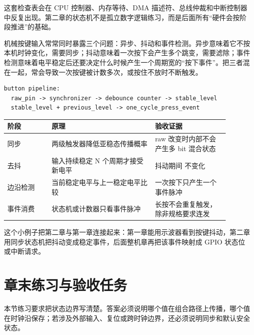 这套检查表会在 CPU 控制器、内存等待、DMA 描述符、总线仲裁和中断控制器中反复出现。第二章的状态机不是孤立数字逻辑练习，而是后面所有“硬件会按阶段推进”的基础。

机械按键输入常常同时暴露三个问题：异步、抖动和事件检测。异步意味着它不按本机时钟变化，需要同步；抖动意味着一次按下会产生多个跳变，需要滤除；事件检测意味着电平稳定后还要决定什么时候产生一个周期宽的“按下事件”。把三者混在一起，常会导致一次按键被计数多次，或按住不放时不断触发。

\begin{lstlisting}
button pipeline:
  raw_pin -> synchronizer -> debounce counter -> stable_level
  stable_level + previous_level -> one_cycle_press_event
\end{lstlisting}

\begin{longtable}{L{0.18\linewidth}L{0.42\linewidth}L{0.3\linewidth}}
\toprule
阶段 & 原理 & 验收证据 \\
\midrule
同步 & 两级触发器降低亚稳态传播概率 & raw 改变时内部不会产生多 bit 混合状态 \\
去抖 & 输入持续稳定 N 个周期才接受新电平 & 抖动期间  不变化 \\
边沿检测 & 当前稳定电平与上一稳定电平比较 & 一次按下只产生一个事件脉冲 \\
事件消费 & 状态机或计数器只看事件脉冲 & 长按不会重复触发，除非规格要求连发 \\
\bottomrule
\end{longtable}

这个小例子把第二章与第一章连接起来：第一章能用示波器看到按键抖动，第二章用同步状态机把抖动变成稳定事件，后面整机章再把该事件映射成 GPIO 状态位或中断请求。

\section*{章末练习与验收任务}

本节练习要求把状态边界写清楚。答案必须说明哪个值在组合路径上传播，哪个值在时钟沿保存；若涉及外部输入、复位或跨时钟边界，还必须说明同步和默认安全状态。

